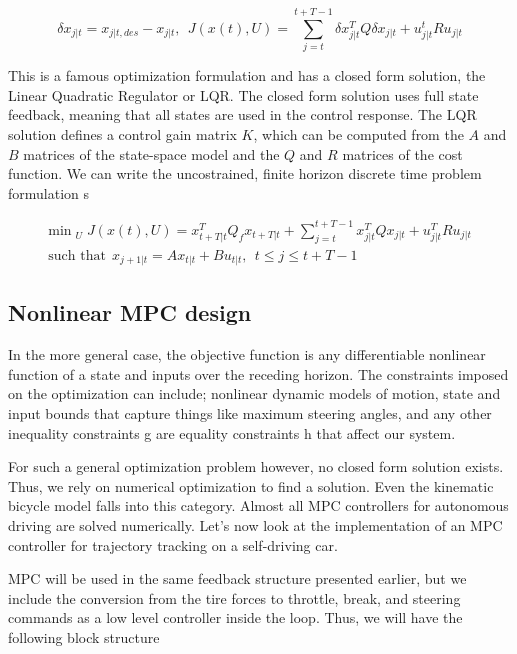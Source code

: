 \begin{equation}
\delta x_{j|t} = x_{j|t,des} - x_{j|t}, ~~ J(x(t) , U) = \sum_{j=t}^{t+T-1} \delta x_{j|t}^TQ\delta x_{j|t} + u_{j|t}^tRu_{j|t}
\end{equation}

This is a famous
optimization formulation and has a closed form solution, the Linear Quadratic Regulator or LQR. The closed form solution
uses full state feedback, meaning that all states are
used in the control response. The LQR solution defines
a control gain matrix $K$, which can be computed from
the $A$ and $B$ matrices of the state-space model and the $Q$ and $R$ matrices
of the cost function. We can write the uncostrained, finite horizon discrete time problem formulation s

\begin{eqnarray}
\text{min}_{\substack{U}}J(x(t), U) = x_{t+T|t}^TQ_fx_{t+T|t} + \sum_{j=t}^{t+T-1}  x_{j|t}^TQ x_{j|t} + u_{j|t}^TRu_{j|t} \\
\text{such that} ~~ x_{j+1|t} = Ax_{t|t} + Bu_{t|t}, ~~ t \leq j \leq t+T-1
\end{eqnarray}

\subsection{Nonlinear MPC design}
\label{nonlinear_mpc_design}

In the more general case, the objective function is any differentiable nonlinear function of a state and inputs over
the receding horizon. The constraints imposed on
the optimization can include; nonlinear dynamic models of motion, state and input bounds that capture things like
maximum steering angles, and any other inequality
constraints g are equality constraints
h that affect our system. 

For such a general optimization problem however, no closed form solution exists. Thus, we  rely on numerical
optimization to find a solution. Even the kinematic bicycle
model falls into this category. Almost all MPC controllers for autonomous driving are solved numerically. Let's now look at
the implementation of an MPC controller for trajectory
tracking on a self-driving car. 

MPC will be used in the same feedback
structure presented earlier, but we include the conversion from the tire forces to throttle, break, and steering commands as a low
level controller inside the loop. Thus, we will have the following block structure

